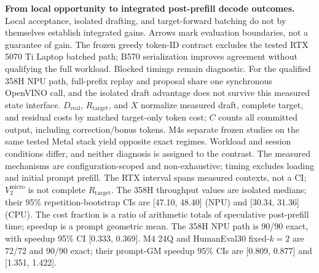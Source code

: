 \textbf{From local opportunity to integrated post-prefill decode outcomes.} Local acceptance, isolated drafting, and target-forward batching do not by themselves establish integrated gains. Arrows mark evaluation boundaries, not a guarantee of gain. The frozen greedy token-ID contract excludes the tested RTX 5070 Ti Laptop batched path; B570 serialization improves agreement without qualifying the full workload. Blocked timings remain diagnostic. For the qualified 358H NPU path, full-prefix replay and proposal share one synchronous OpenVINO call, and the isolated draft advantage does not survive this measured state interface. $D_{\mathrm{real}}$, $R_{\mathrm{target}}$, and $X$ normalize measured draft, complete target, and residual costs by matched target-only token cost; $C$ counts all committed output, including correction/bonus tokens. M4\textquotesingle s separate frozen studies on the same tested Metal stack yield opposite exact regimes. Workload and session conditions differ, and neither diagnosis is assigned to the contrast. The measured mechanisms are configuration-scoped and non-exhaustive; timing excludes loading and initial prompt prefill. The RTX interval spans measured contexts, not a CI; $V_2^{\mathrm{micro}}$ is not complete $R_{\mathrm{target}}$. The 358H throughput values are isolated medians; their 95\% repetition-bootstrap CIs are [47.10, 48.40] (NPU) and [30.34, 31.36] (CPU). The cost fraction is a ratio of arithmetic totals of speculative post-prefill time; speedup is a prompt geometric mean. The 358H NPU path is 90/90 exact, with speedup 95\% CI [0.333, 0.369]. M4 24Q and HumanEval30 fixed-$k=2$ are 72/72 and 90/90 exact; their prompt-GM speedup 95\% CIs are [0.809, 0.877] and [1.351, 1.422].
